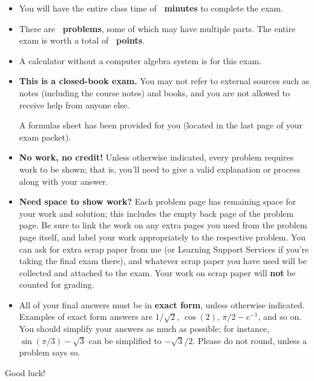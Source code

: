 \begin{tcolorbox}[enhanced,attach boxed title to top center=
	{yshift=-2mm,yshifttext=-1mm},colback=white,colframe=black,colbacktitle=black,title={\textbf{Instructions for the exam}}]
	\begin{itemize}
		\item You will have the entire class time of \textbf{\  minutes} to complete the exam. 
		\item There are \textbf{\ problems}, some of which may have multiple parts. The entire exam is worth a total of \textbf{\ points}.
		\item A calculator without a computer algebra system is \emph{} for this exam.
		\item \textbf{This is a closed-book exam.} You may not refer to external sources such as notes (including the course notes) and books, and you are not allowed to receive help from anyone else.
		
		A formulas sheet has been provided for you (located in the last page of your exam packet).
		\item \textbf{No work, no credit!} Unless otherwise indicated, every problem requires work to be shown; that is, you'll need to give a valid explanation or process along with your answer. 
		\item \textbf{Need space to show work?} Each problem page has remaining space for your work and solution; this includes the empty back page of the problem page. Be sure to link the work on any extra pages you used from the problem page itself, and label your work appropriately to the respective problem. You can ask for extra scrap paper from me (or Learning Support Services if you're taking the final exam there), and whatever scrap paper you have used will be collected and attached to the exam. Your work on scrap paper will \textbf{not} be counted for grading.
		\item All of your final answers must be in \textbf{exact form}, unless otherwise indicated. Examples of exact form answers are $1/\sqrt{2}$, $\cos(2)$, $\pi/2-e^{-1}$, and so on. You should simplify your answers as much as possible; for instance, $\sin(\pi / 3)-\sqrt{3}$ can be simplified to $-\sqrt{3}/2$. Please do not round, unless a problem says so.
	\end{itemize}
	\centering \Large{Good luck!} 
	\vspace*{1em}
\end{tcolorbox}